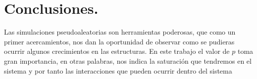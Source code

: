 \documentclass{article}
\begin{document}
\section{Conclusiones.}
 Las simulaciones pseudoaleatorias son herramientas poderosas, que como un primer acercamientos, nos dan la oportunidad de observar como se pudieras ocurrir algunos crecimientos en las estructuras. En este trabajo el valor de $p$ toma gran importancia, en otras palabras, nos indica la saturación que tendremos en el sistema y por tanto las interacciones que pueden ocurrir dentro del sistema 


\end{document}

